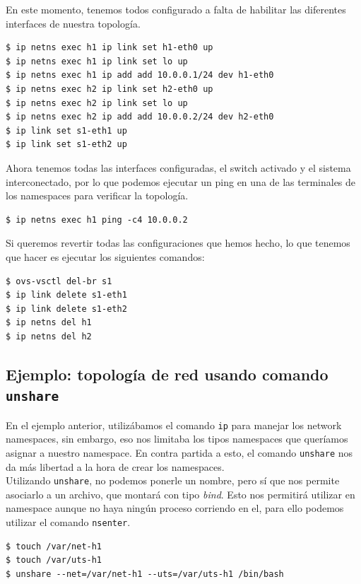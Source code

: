 \documentclass[12pt]{article}
\begin{document}
	\noindent En este momento, tenemos todos configurado a falta de habilitar las diferentes interfaces de nuestra topología.
	\begin{verbatim}
$ ip netns exec h1 ip link set h1-eth0 up
$ ip netns exec h1 ip link set lo up
$ ip netns exec h1 ip add add 10.0.0.1/24 dev h1-eth0
$ ip netns exec h2 ip link set h2-eth0 up
$ ip netns exec h2 ip link set lo up
$ ip netns exec h2 ip add add 10.0.0.2/24 dev h2-eth0
$ ip link set s1-eth1 up
$ ip link set s1-eth2 up
	\end{verbatim}

	\noindent Ahora tenemos todas las interfaces configuradas, el switch activado y el sistema interconectado, por lo que podemos ejecutar un ping en una de las terminales de los namespaces para verificar la topología.
	\begin{verbatim}
$ ip netns exec h1 ping -c4 10.0.0.2
	\end{verbatim}

	\noindent Si queremos revertir todas las configuraciones que hemos hecho, lo que tenemos que hacer es ejecutar los siguientes comandos:
	\begin{verbatim}
$ ovs-vsctl del-br s1
$ ip link delete s1-eth1
$ ip link delete s1-eth2
$ ip netns del h1
$ ip netns del h2
	\end{verbatim}

	\pagebreak

	\subsection{Ejemplo: topología de red usando comando \texttt{unshare}}
	\noindent En el ejemplo anterior, utilizábamos el comando \texttt{ip} para manejar los network namespaces, sin embargo, eso nos limitaba los tipos namespaces que queríamos asignar a nuestro namespace. En contra partida a esto, el comando \texttt{unshare} nos da más libertad a la hora de crear los namespaces. \\
	
	\noindent Utilizando \texttt{unshare}, no podemos ponerle un nombre, pero sí que nos permite asociarlo a un archivo, que montará con tipo \textit{bind}. Esto nos permitirá utilizar en namespace aunque no haya ningún proceso corriendo en el, para ello podemos utilizar el comando \texttt{nsenter}.
	\begin{verbatim}
$ touch /var/net-h1
$ touch /var/uts-h1
$ unshare --net=/var/net-h1 --uts=/var/uts-h1 /bin/bash
	\end{verbatim}
\end{document}

